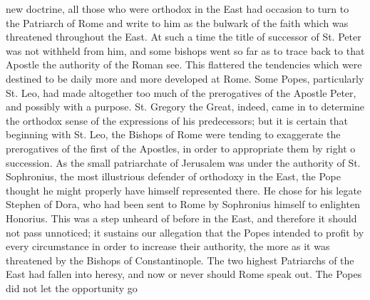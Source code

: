 new doctrine, all those who were orthodox in the East had occasion to turn to the Patriarch of Rome and write to him as the bulwark of the faith which was threatened throughout the East. At such a time the title of successor of St. Peter was not withheld from him, and some bishops went so far as to trace back to that Apostle the authority of the Roman see. This flattered the tendencies which were destined to be daily more and more developed at Rome. Some Popes, particularly St. Leo, had made altogether too much of the prerogatives of the Apostle Peter, and possibly with a purpose. St. Gregory the Great, indeed, came in to determine the orthodox sense of the expressions of his predecessors; but it is certain that beginning with St. Leo, the Bishops of Rome were tending to exaggerate the prerogatives of the first of the Apostles, in order to appropriate them by right o succession. As the small patriarchate of Jerusalem was under the authority of St. Sophronius, the most illustrious defender of orthodoxy in the East, the Pope thought he might properly have himself represented there. He chose for his legate Stephen of Dora, who had been sent to Rome by Sophronius himself to enlighten Honorius. This was a step unheard of before in the East, and therefore it should not pass unnoticed; it sustains our allegation that the Popes intended to profit by every circumstance in order to increase their authority, the more as it was threatened by the Bishops of Constantinople. The two highest Patriarchs of the East had fallen into heresy, and now or never should Rome speak out. The Popes did not let the opportunity go

